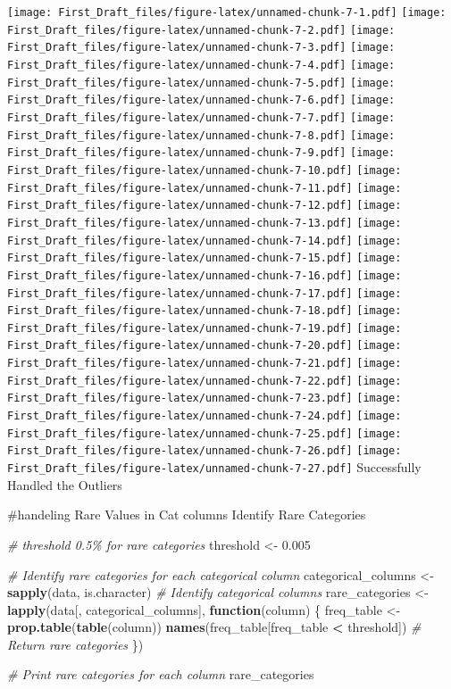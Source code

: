 \documentclass[
]{article}
\newenvironment{Shaded}{\begin{snugshade}}{\end{snugshade}}
\newcommand{\CommentTok}[1]{\textcolor[rgb]{0.56,0.35,0.01}{\textit{#1}}}
\newcommand{\ControlFlowTok}[1]{\textcolor[rgb]{0.13,0.29,0.53}{\textbf{#1}}}
\newcommand{\FloatTok}[1]{\textcolor[rgb]{0.00,0.00,0.81}{#1}}
\newcommand{\FunctionTok}[1]{\textcolor[rgb]{0.13,0.29,0.53}{\textbf{#1}}}
\newcommand{\NormalTok}[1]{#1}
\newcommand{\OtherTok}[1]{\textcolor[rgb]{0.56,0.35,0.01}{#1}}
\newcommand{\SpecialCharTok}[1]{\textcolor[rgb]{0.81,0.36,0.00}{\textbf{#1}}}
\begin{document}
\texttt{[image: First\_Draft\_files/figure-latex/unnamed-chunk-7-1.pdf]}
\texttt{[image: First\_Draft\_files/figure-latex/unnamed-chunk-7-2.pdf]}
\texttt{[image: First\_Draft\_files/figure-latex/unnamed-chunk-7-3.pdf]}
\texttt{[image: First\_Draft\_files/figure-latex/unnamed-chunk-7-4.pdf]}
\texttt{[image: First\_Draft\_files/figure-latex/unnamed-chunk-7-5.pdf]}
\texttt{[image: First\_Draft\_files/figure-latex/unnamed-chunk-7-6.pdf]}
\texttt{[image: First\_Draft\_files/figure-latex/unnamed-chunk-7-7.pdf]}
\texttt{[image: First\_Draft\_files/figure-latex/unnamed-chunk-7-8.pdf]}
\texttt{[image: First\_Draft\_files/figure-latex/unnamed-chunk-7-9.pdf]}
\texttt{[image: First\_Draft\_files/figure-latex/unnamed-chunk-7-10.pdf]}
\texttt{[image: First\_Draft\_files/figure-latex/unnamed-chunk-7-11.pdf]}
\texttt{[image: First\_Draft\_files/figure-latex/unnamed-chunk-7-12.pdf]}
\texttt{[image: First\_Draft\_files/figure-latex/unnamed-chunk-7-13.pdf]}
\texttt{[image: First\_Draft\_files/figure-latex/unnamed-chunk-7-14.pdf]}
\texttt{[image: First\_Draft\_files/figure-latex/unnamed-chunk-7-15.pdf]}
\texttt{[image: First\_Draft\_files/figure-latex/unnamed-chunk-7-16.pdf]}
\texttt{[image: First\_Draft\_files/figure-latex/unnamed-chunk-7-17.pdf]}
\texttt{[image: First\_Draft\_files/figure-latex/unnamed-chunk-7-18.pdf]}
\texttt{[image: First\_Draft\_files/figure-latex/unnamed-chunk-7-19.pdf]}
\texttt{[image: First\_Draft\_files/figure-latex/unnamed-chunk-7-20.pdf]}
\texttt{[image: First\_Draft\_files/figure-latex/unnamed-chunk-7-21.pdf]}
\texttt{[image: First\_Draft\_files/figure-latex/unnamed-chunk-7-22.pdf]}
\texttt{[image: First\_Draft\_files/figure-latex/unnamed-chunk-7-23.pdf]}
\texttt{[image: First\_Draft\_files/figure-latex/unnamed-chunk-7-24.pdf]}
\texttt{[image: First\_Draft\_files/figure-latex/unnamed-chunk-7-25.pdf]}
\texttt{[image: First\_Draft\_files/figure-latex/unnamed-chunk-7-26.pdf]}
\texttt{[image: First\_Draft\_files/figure-latex/unnamed-chunk-7-27.pdf]}
Successfully Handled the Outliers

\#handeling Rare Values in Cat columns Identify Rare Categories

\begin{Shaded}
\begin{Highlighting}[]
\CommentTok{\#  threshold 0.5\%  for rare categories}
\NormalTok{threshold }\OtherTok{\textless{}{-}} \FloatTok{0.005}

\CommentTok{\# Identify rare categories for each categorical column}
\NormalTok{categorical\_columns }\OtherTok{\textless{}{-}} \FunctionTok{sapply}\NormalTok{(data, is.character)  }\CommentTok{\# Identify categorical columns}
\NormalTok{rare\_categories }\OtherTok{\textless{}{-}} \FunctionTok{lapply}\NormalTok{(data[, categorical\_columns], }\ControlFlowTok{function}\NormalTok{(column) \{}
\NormalTok{  freq\_table }\OtherTok{\textless{}{-}} \FunctionTok{prop.table}\NormalTok{(}\FunctionTok{table}\NormalTok{(column))}
  \FunctionTok{names}\NormalTok{(freq\_table[freq\_table }\SpecialCharTok{\textless{}}\NormalTok{ threshold])  }\CommentTok{\# Return rare categories}
\NormalTok{\})}

\CommentTok{\# Print rare categories for each column}
\NormalTok{rare\_categories}
\end{Highlighting}
\end{Shaded}
\end{document}
